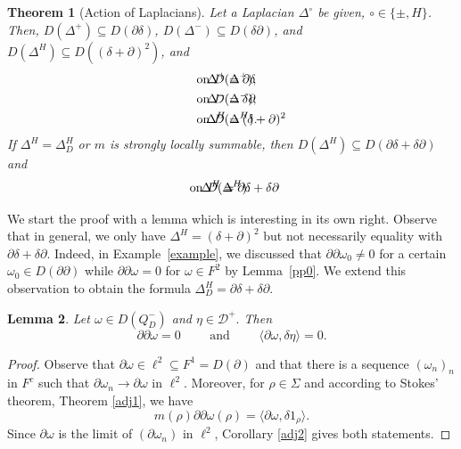 \documentclass[10pt]{amsart}
\newtheorem{theorem}{Theorem}[section]
\newtheorem{lemma}[theorem]{Lemma}
\theoremstyle{definition}
\renewcommand{\bullet}{{\circ}}
\begin{document}
\begin{theorem}[Action of  Laplacians]\label{action} Let a Laplacian $\Delta^{\bullet}$  be given,  $\bullet\in\{\pm,H\}$. Then, $D(\Delta^{+})\subseteq D(\partial\delta)$,  $D(\Delta^{-})\subseteq D(\delta\partial)$, and  $D(\Delta^{H})\subseteq D((\delta+\partial)^{2})$, and
	\begin{align*}
		\Delta^+ &=\partial\delta&&\hspace{-3cm}\mbox{ on }D(\Delta^{+}),\\
		\Delta^- &=\delta\partial&&\hspace{-3cm} \mbox{ on }D(\Delta^{-}),\\
		\Delta^H &=(\delta+\partial)^{2}&&\hspace{-3cm} \mbox{ on }D(\Delta^{H}).
	\end{align*}
	If $\Delta^{H}=\Delta^{H}_{D} $ or $m$ is strongly locally summable, then  $D(\Delta^{H})\subseteq D(\partial\delta+\delta\partial)$
	and
	\begin{align*}
			\Delta^H &=\partial\delta+\delta\partial&&\hspace{-3cm} \mbox{ on }D(\Delta^{H}).
	\end{align*}
\end{theorem}
We start the proof with a lemma which is interesting in its own right. 
Observe that in general, we only have $\Delta^{H}=(\delta+\partial)^{2}$ but not necessarily equality with $\partial\delta+\delta\partial$. Indeed, in Example~\ref{example}, we discussed that $\partial\partial \omega_{0}\ne0$ for a certain $\omega_{0}\in D(\partial\partial)$ while $\partial\partial \omega =0$ for $\omega \in F^{2}$ by Lemma~\ref{pp0}.  We extend this observation to obtain the formula $\Delta^{H}_{D}=\partial\delta+\delta\partial.$
\begin{lemma}\label{pp01}
	Let $\omega\in D(Q^-_{D})$ and $\eta\in \mathcal{D}^+.$ Then $$\partial\partial\omega = 0\qquad \mbox{ and }\qquad \langle\partial\omega,\delta\eta\rangle = 0.$$
\end{lemma}
\begin{proof}
	Observe that $\partial\omega\in\ell^2\subseteq F^1 = D(\partial)$ and that there is a sequence $(\omega_n)_n$ in $F^c$ such that $\partial\omega_n\rightarrow\partial\omega$ in $\ell^2.$ Moreover, for $\rho\in\Sigma$ and according to Stokes' theorem, Theorem \ref{adj1}, we have $$m(\rho)\partial\partial\omega(\rho) = \langle \partial\omega,\delta1_\rho\rangle.$$
	Since $\partial\omega$ is the limit of $(\partial\omega_n)$ in $\ell^2$,  Corollary \ref{adj2}  gives both statements.
\end{proof}
\end{document}
